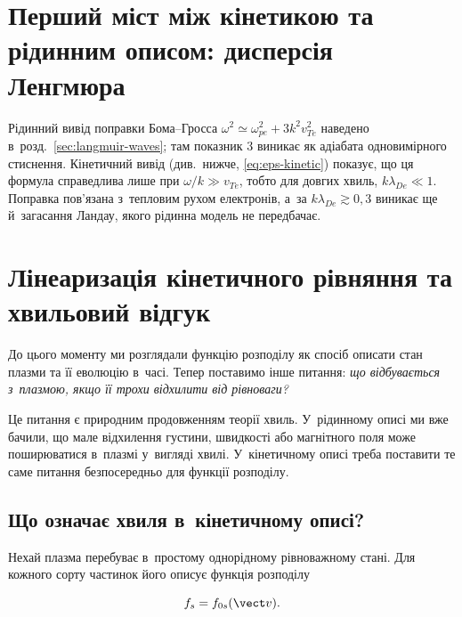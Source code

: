 \section{Перший міст між кінетикою та рідинним описом: дисперсія Ленгмюра}

Рідинний вивід поправки Бома--Гросса $\omega^2\simeq\omega_{pe}^2+3k^2v_{Te}^2$
наведено в~розд.~\ref{sec:langmuir-waves}; там показник $3$ виникає як адіабата
одновимірного стиснення. Кінетичний вивід (див.\ нижче, \eqref{eq:eps-kinetic})
показує, що ця формула справедлива лише при $\omega/k\gg v_{Te}$, тобто для довгих хвиль,
$k\lambda_{De}\ll1$. Поправка пов'язана з~тепловим рухом електронів, а~за
$k\lambda_{De}\gtrsim0{,}3$ виникає ще й~загасання Ландау, якого рідинна модель
не передбачає.

\section{Лінеаризація кінетичного рівняння та хвильовий відгук}

До цього моменту ми розглядали функцію розподілу як спосіб описати стан плазми та її
еволюцію в~часі. Тепер поставимо інше питання: \emph{що відбувається з~плазмою, якщо
її трохи відхилити від рівноваги?}

Це питання є природним продовженням теорії хвиль. У~рідинному описі ми вже бачили,
що мале відхилення густини, швидкості або магнітного поля може поширюватися в~плазмі
у~вигляді хвилі. У~кінетичному описі треба поставити те саме питання безпосередньо
для функції розподілу.

\subsection*{Що означає хвиля в~кінетичному описі?}

Нехай плазма перебуває в~простому однорідному рівноважному стані. Для кожного сорту
частинок його описує функція розподілу

\begin{equation}\label{eq:kinetic-equilibrium-distribution}
f_s=f_{0s}(\vect v).
\end{equation}

